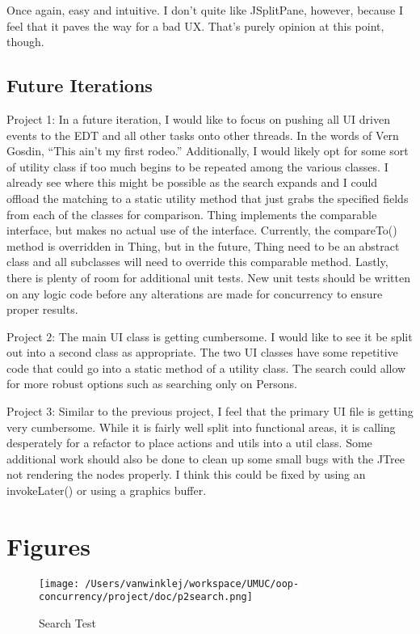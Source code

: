 \documentclass[english,floatsintext,man]{apa6}
\begin{document}
Once again, easy and intuitive. I don't quite like JSplitPane, however,
because I feel that it paves the way for a bad UX. That's purely opinion
at this point, though.

\subsection{Future Iterations}\label{future-iterations}

Project 1: In a future iteration, I would like to focus on pushing all
UI driven events to the EDT and all other tasks onto other threads. In
the words of Vern Gosdin, \enquote{This ain't my first rodeo.}
Additionally, I would likely opt for some sort of utility class if too
much begins to be repeated among the various classes. I already see
where this might be possible as the search expands and I could offload
the matching to a static utility method that just grabs the specified
fields from each of the classes for comparison. Thing implements the
comparable interface, but makes no actual use of the interface.
Currently, the compareTo() method is overridden in Thing, but in the
future, Thing need to be an abstract class and all subclasses will need
to override this comparable method. Lastly, there is plenty of room for
additional unit tests. New unit tests should be written on any logic
code before any alterations are made for concurrency to ensure proper
results.

Project 2: The main UI class is getting cumbersome. I would like to see
it be split out into a second class as appropriate. The two UI classes
have some repetitive code that could go into a static method of a
utility class. The search could allow for more robust options such as
searching only on Persons.

Project 3: Similar to the previous project, I feel that the primary UI
file is getting very cumbersome. While it is fairly well split into
functional areas, it is calling desperately for a refactor to place
actions and utils into a util class. Some additional work should also be
done to clean up some small bugs with the JTree not rendering the nodes
properly. I think this could be fixed by using an invokeLater() or using
a graphics buffer.

\section{Figures}\label{figures}

\begin{figure}[htbp]
\centering
\texttt{[image: /Users/vanwinklej/workspace/UMUC/oop-concurrency/project/doc/p2search.png]}
\caption{Search Test}
\end{figure}
\end{document}
